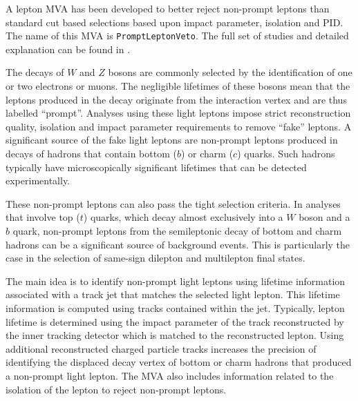 
A lepton MVA has been developed to better reject non-prompt leptons than standard cut based selections based upon impact parameter, isolation and PID. The name of this MVA is \texttt{PromptLeptonVeto}. The full set of studies and detailed explanation can be found in \cite{ttW_140}.

The decays of $W$ and $Z$ bosons are commonly selected by the identification of one or two electrons or muons.  The negligible lifetimes of these bosons mean that the leptons produced in the decay originate from the interaction vertex and are thus labelled ``prompt''.  Analyses using these light leptons impose strict reconstruction quality, isolation and impact parameter requirements to remove ``fake'' leptons. A significant source of the fake light leptons are non-prompt leptons produced in decays of hadrons that contain bottom ($b$) or charm ($c$) quarks. Such hadrons typically have microscopically significant lifetimes that can be detected experimentally.

These non-prompt leptons can also pass the tight selection criteria. In analyses that involve top ($t$) quarks, which decay almost exclusively into a $W$ boson and a $b$ quark, non-prompt leptons from the semileptonic decay of bottom and charm hadrons can be a significant source of background events. This is particularly the case in the selection of same-sign dilepton and multilepton final states. 

The main idea is to identify non-prompt light leptons using lifetime information associated with a track jet that matches the selected light lepton. This lifetime information is computed using tracks contained within the jet. Typically, lepton lifetime is determined using the impact parameter of the track reconstructed by the inner tracking detector which is matched to the reconstructed lepton. Using additional reconstructed charged particle tracks increases the precision of identifying the displaced decay vertex of bottom or charm hadrons that produced a non-prompt light lepton. The MVA also includes information related to the isolation of the lepton to reject non-prompt leptons.

